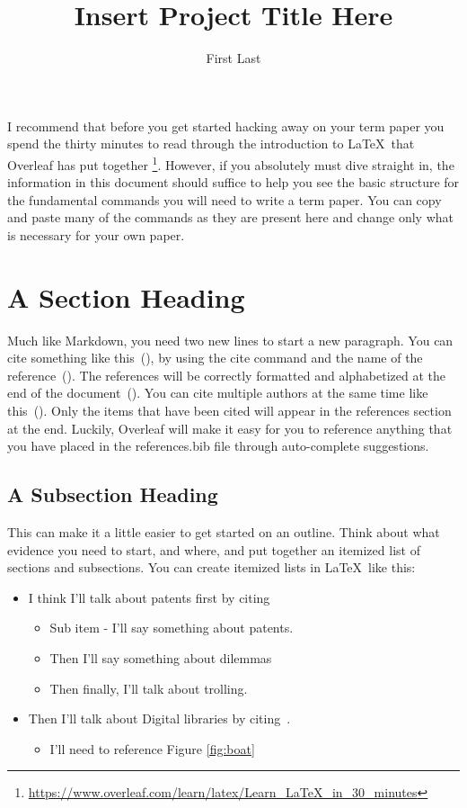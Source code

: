 \documentclass[12pt,man,hidelinks]{apa7}
\title{\large{Insert Project Title Here}}
\author{First Last}
\affiliation{American University}
\begin{document}
\maketitle

I recommend that before you get started hacking away on your term paper you spend the thirty minutes to read through the introduction to \LaTeX~that Overleaf has put together \footnote{\url{https://www.overleaf.com/learn/latex/Learn_LaTeX_in_30_minutes}}. However, if you absolutely must dive straight in, the information in this document should suffice to help you see the basic structure for the fundamental commands you will need to write a term paper. You can copy and paste many of the commands as they are present here and change only what is necessary for your own paper.

\section{A Section Heading} 
Much like Markdown, you need two new lines to start a new paragraph. You can cite something like this~(\cite{Abril07}), by using the cite command and the name of the reference~(\cite{JCohen96}). The references will be correctly formatted and alphabetized at the end of the document~(\cite{Cohen07}). You can cite multiple authors at the same time like this~(\cite{Abril07, Cohen07}). Only the items that have been cited will appear in the references section at the end. Luckily, Overleaf will make it easy for you to reference anything that you have placed in the references.bib file through auto-complete suggestions. 

\subsection{A Subsection Heading}

This can make it a little easier to get started on an outline. Think about what evidence you need to start, and where, and put together an itemized list of sections and subsections. You can create itemized lists in \LaTeX~like this:

\begin{itemize}
    \item I think I'll talk about patents first by citing \cite{Abril07}
    \begin{itemize}
        \item Sub item - I'll say something about patents.
        \item Then I'll say something about dilemmas
        \item Then finally, I'll talk about trolling. 
    \end{itemize}
    \item Then I'll talk about Digital libraries by citing~\cite{JCohen96}.
    \begin{itemize}
        \item I'll need to reference Figure \ref{fig:boat}
    \end{itemize}
\end{itemize}
\end{document}
